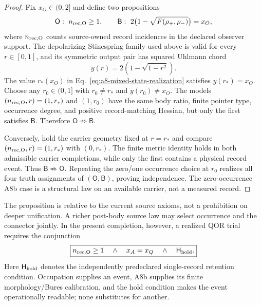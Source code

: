 \documentclass[11pt]{article}
\begin{document}
\begin{proof}
Fix \(x_O\in(0,2]\) and define two propositions
\begin{equation}
 \mathsf{O}:\ n_{\rm rec,O}\geq1,
 \qquad
 \mathsf{B}:\
 2\bigl(1-\sqrt{F(\rho_+,\rho_-)}\bigr)=x_O,
 \label{eq:a8-occurrence-predicates}
\end{equation}
where \(n_{\rm rec,O}\) counts source-owned record incidences in the declared
observer support.  The depolarizing Stinespring family used above is valid for
every \(r\in[0,1]\), and its symmetric output pair has squared Uhlmann chord
\begin{equation}
 y(r)=2\left(1-\sqrt{1-r^2}\right).
 \label{eq:a8-occurrence-chord-family}
\end{equation}
The value \(r_*(x_O)\) in Eq.~\eqref{eq:a8-mixed-state-realization} satisfies
\(y(r_*)=x_O\).  Choose any \(r_0\in(0,1]\) with \(r_0\neq r_*\) and
\(y(r_0)\neq x_O\).  The models
\((n_{\rm rec,O},r)=(1,r_*)\) and \((1,r_0)\) have the same body ratio,
finite pointer type, occurrence degree, and positive record-matching Hessian,
but only the first satisfies \(\mathsf{B}\).  Therefore
\(\mathsf{O}\not\Rightarrow\mathsf{B}\).

Conversely, hold the carrier geometry fixed at \(r=r_*\) and compare
\((n_{\rm rec,O},r)=(1,r_*)\) with \((0,r_*)\).  The finite metric identity
holds in both admissible carrier completions, while only the first contains a
physical record event.  Thus \(\mathsf{B}\not\Rightarrow\mathsf{O}\).
Repeating the zero/one occurrence choice at \(r_0\) realizes all four truth
assignments of \((\mathsf{O},\mathsf{B})\), proving independence.  The
zero-occurrence A8b
case is a structural law on an available carrier, not a measured record.
\end{proof}

The proposition is relative to the current source axioms, not a prohibition
on deeper unification.  A richer post-body source law may select occurrence
and the connector jointly.  In the present completion, however, a realized
QOR trial requires the conjunction
\begin{equation}
 \boxed{
 n_{\rm rec,O}\geq1
 \quad\wedge\quad
 x_A=x_Q
 \quad\wedge\quad
 \mathsf{H}_{\rm hold}.}
 \label{eq:qor-three-condition-conjunction}
\end{equation}
Here \(\mathsf{H}_{\rm hold}\) denotes the independently predeclared
single-record retention condition.  Occupation supplies an event, A8b
supplies its finite morphology/Bures calibration, and the hold condition makes
the event operationally readable; none substitutes for another.
\end{document}
